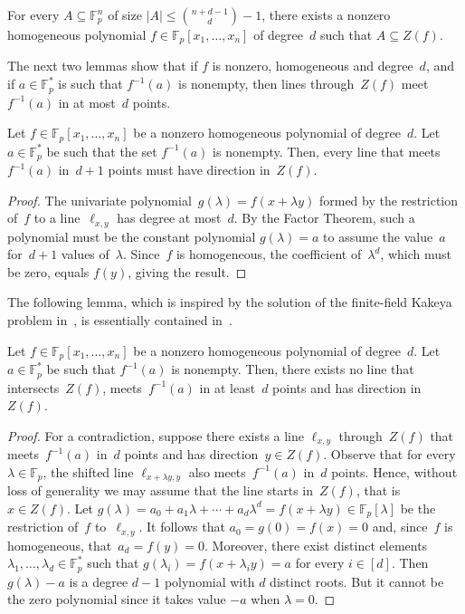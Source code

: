 \documentclass{toc}
\newcommand{\F}{{\mathbb{F}}}
\begin{document}
\begin{lemma}\label{lem:hom-interpolation}
For every $A\subseteq \F_p^n$ of size $|A| \leq \binom{n+d-1}{d} - 1$,
there exists a nonzero homogeneous polynomial $f\in\F_p[x_1,\dots,x_n]$ of degree~$d$ such that $A\subseteq Z(f)$.
\end{lemma}

The next two lemmas show that if $f$ is nonzero, homogeneous and degree~$d$, and if $a\in\F_p^*$ is such that $f^{-1}(a)$ is nonempty, then  lines through~$Z(f)$ meet~$f^{-1}(a)$ in at most~$d$ points.

\begin{lemma}\label{lem:zerodirection}
Let $f\in\F_p[x_1,\dots,x_n]$ be a nonzero homogeneous polynomial of degree~$d$.
Let $a\in\F_p^*$ be such that the set $f^{-1}(a)$ is nonempty.
Then, every line that meets~$f^{-1}(a)$ in~$d+1$ points must have direction in~$Z(f)$.
\end{lemma}

\begin{proof}
The univariate polynomial~$g(\lambda) = f(x + \lambda y)$ formed by the restriction of~$f$ to  a line~$\ell_{x,y}$ has degree at most~$d$.
By the Factor Theorem, such a polynomial must be the constant polynomial $g(\lambda) = a$ to assume the value~$a$ for~$d+1$ values of~$\lambda$.
Since~$f$ is homogeneous, the coefficient of~$\lambda^d$, which must be zero, equals $f(y)$, giving the result.
\end{proof}

The following lemma, which is inspired by the solution of the finite-field Kakeya problem in~\cite{dvir:2009}, is essentially contained in~\cite{BrietRao:2016}.

\begin{lemma}\label{lem:zero-one}
Let $f\in\F_p[x_1,\dots,x_n]$ be a nonzero homogeneous polynomial of degree~$d$.
Let $a\in\F_p^*$ be such that $f^{-1}(a)$ is nonempty.
Then, there exists no line that intersects~$Z(f)$, meets~$f^{-1}(a)$ in at least~$d$ points and has direction in~$Z(f)$.
\end{lemma}

\begin{proof}
For a contradiction, suppose there exists a line $\ell_{x,y}$ through~$Z(f)$ that meets~$f^{-1}(a)$ in~$d$ points and has direction~$y\in Z(f)$.
Observe that for every $\lambda\in\F_p$, the shifted line $\ell_{x + \lambda y, y}$ also meets~$f^{-1}(a)$ in~$d$ points.
Hence, without loss of generality we may assume that the line starts in~$Z(f)$, that is~$x\in Z(f)$.
Let $g(\lambda) = a_0 + a_1\lambda + \cdots + a_d\lambda^d = f(x + \lambda y)\in\F_p[\lambda]$ be the restriction of~$f$ to~$\ell_{x,y}$.
It follows that $a_0 = g(0) = f(x) = 0$ and, since~$f$ is homogeneous, that~$a_d = f(y) = 0$.
Moreover, there exist distinct elements $\lambda_1,\dots,\lambda_d \in \F_p^*$ such that $g(\lambda_i) = f(x+\lambda_i y) = a$ for every $i\in[d]$. Then $g(\lambda)-a$ is a degree $d-1$ polynomial with $d$ distinct roots. But it cannot be the zero polynomial since it takes value $-a$ when $\lambda=0$.
\end{proof}
\end{document}
